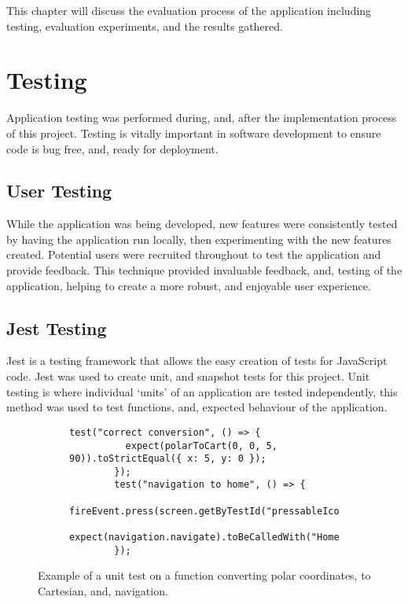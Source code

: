 This chapter will discuss the evaluation process of the application including testing, evaluation experiments, and the results gathered.

\section{Testing}
Application testing was performed during, and, after the implementation process of this project. Testing is vitally important in software development to ensure code is bug free, and, ready for deployment.

\subsection{User Testing}
While the application was being developed, new features were consistently tested by having the application run locally, then experimenting with the new features created. Potential users were recruited throughout to test the application and provide feedback. This technique provided invaluable feedback, and, testing of the application, helping to create a more robust, and enjoyable user experience.

\subsection{Jest Testing}
Jest is a testing framework that allows the easy creation of tests for JavaScript code. Jest was used to create unit, and snapshot tests for this project. Unit testing is where individual `units' of an application are tested independently, this method was used to test functions, and, expected behaviour of the application. 

\begin{figure}[!htbp]
    \centering
    \begin{subfigure}[b]{0.8\textwidth}
        \begin{lstlisting}[language=jsJsx]
        test("correct conversion", () => {
          expect(polarToCart(0, 0, 5, 90)).toStrictEqual({ x: 5, y: 0 });
        });
        test("navigation to home", () => {
            fireEvent.press(screen.getByTestId("pressableIcon"));
            expect(navigation.navigate).toBeCalledWith("HomeScreen");
        });
        \end{lstlisting}
    \end{subfigure}
\caption[Example of a unit test]{Example of a unit test on a function converting polar coordinates, to Cartesian, and, navigation.}
\label{fig:jestUnit}
\end{figure}
\FloatBarrier

